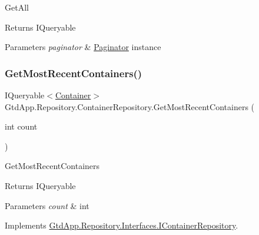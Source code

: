 Get\+All 

\begin{DoxyReturn}{Returns}
I\+Queryable
\end{DoxyReturn}

\begin{DoxyParams}{Parameters}
{\em paginator} & \mbox{\hyperlink{class_gtd_app_1_1_repository_1_1_paginator}{Paginator}} instance\\
\hline
\end{DoxyParams}
\mbox{\label{class_gtd_app_1_1_repository_1_1_container_repository_a3561741b8f76be818b48fdcd4d45c351}} 
\subsubsection{\texorpdfstring{Get\+Most\+Recent\+Containers()}{GetMostRecentContainers()}}
{\footnotesize\ttfamily I\+Queryable$<$\mbox{\hyperlink{class_gtd_app_1_1_data_1_1_container}{Container}}$>$ Gtd\+App.\+Repository.\+Container\+Repository.\+Get\+Most\+Recent\+Containers (\begin{DoxyParamCaption}\item[{int}]{count }\end{DoxyParamCaption})}



Get\+Most\+Recent\+Containers 

\begin{DoxyReturn}{Returns}
I\+Queryable
\end{DoxyReturn}

\begin{DoxyParams}{Parameters}
{\em count} & int\\
\hline
\end{DoxyParams}


Implements \mbox{\hyperlink{interface_gtd_app_1_1_repository_1_1_interfaces_1_1_i_container_repository_ab1ca01a7ba1394f3a611fee57dc12646}{Gtd\+App.\+Repository.\+Interfaces.\+I\+Container\+Repository}}.

\mbox{\label{class_gtd_app_1_1_repository_1_1_container_repository_a8bb337e076498a56737c6c6874fe5b98}} 
